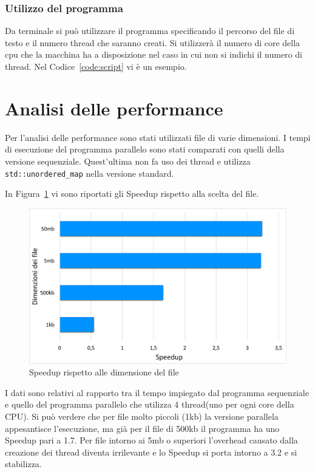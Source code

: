 \documentclass[10pt,twocolumn,letterpaper]{article}
\newcommand{\code}[1]{\texttt{#1}}
\begin{document}
\subsubsection{Utilizzo del programma}
\label{util}
Da terminale si può utilizzare il programma specificando il percorso del file di testo e il numero thread che saranno creati. Si utilizzerà il numero di core della cpu
che la macchina ha a disposizione nel caso in cui non si indichi il numero di thread. Nel Codice~\ref{code:script} vi è un esempio.


\section{Analisi delle performance}
\label{analisi}
Per l'analisi delle performance sono stati utilizzati file di varie dimensioni. I tempi di esecuzione del programma parallelo
sono stati comparati con quelli della versione sequenziale. Quest'ultima non fa uso dei thread e utilizza \code{std::unordered\_map}
nella versione standard.

In Figura~\ref{fig:speed1} vi sono riportati gli Speedup rispetto alla scelta del file.
\begin{figure}
  \centering
    \includegraphics[width=\linewidth]{img/speed1.png}
  \caption{Speedup rispetto alle dimensione del file}
  \label{fig:speed1}
\end{figure}
I dati sono relativi al rapporto tra il tempo impiegato dal programma sequenziale e quello del programma parallelo che utilizza 4 thread(uno per ogni core della CPU).
Si può verdere che per file molto piccoli (1kb) la versione parallela appesantisce l'esecuzione, ma già per il file di 500kb
il programma ha uno Speedup pari a 1.7. Per file intorno ai 5mb o superiori l'overhead causato dalla creazione dei thread diventa irrilevante e lo Speedup si porta intorno a 3.2 e si stabilizza.
\end{document}
